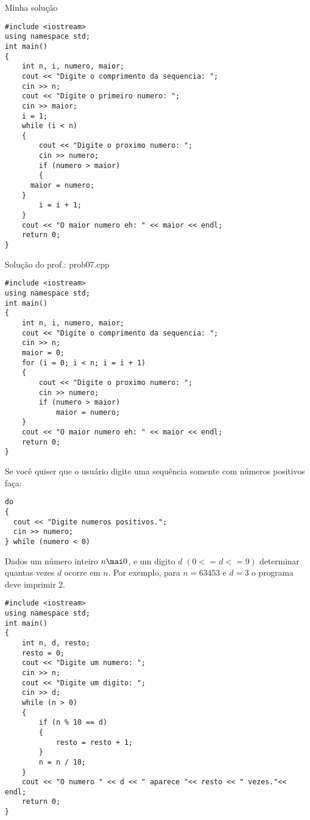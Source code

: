 \documentclass[a4paper]{memoir}
\begin{document}
\begin{sol}
Minha solução

\begin{lstlisting}
#include <iostream>
using namespace std;
int main()
{
    int n, i, numero, maior;
    cout << "Digite o comprimento da sequencia: ";
    cin >> n;
    cout << "Digite o primeiro numero: ";
    cin >> maior;
    i = 1;
    while (i < n)
    {
        cout << "Digite o proximo numero: ";
        cin >> numero;
        if (numero > maior)
        {
	  maior = numero;
	}
        i = i + 1;
    }
    cout << "O maior numero eh: " << maior << endl;
    return 0;
}
\end{lstlisting}

Solução do prof.: prob07.cpp
\begin{lstlisting}
#include <iostream>
using namespace std;
int main()
{
    int n, i, numero, maior;
    cout << "Digite o comprimento da sequencia: ";
    cin >> n;
    maior = 0;
    for (i = 0; i < n; i = i + 1)
    {
        cout << "Digite o proximo numero: ";
        cin >> numero;
        if (numero > maior)
            maior = numero;
    }
    cout << "O maior numero eh: " << maior << endl;
    return 0;
}
\end{lstlisting}
\end{sol}

Se você quiser que o usuário digite uma sequência somente com números positivos faça:

\begin{lstlisting}
do
{
  cout << "Digite numeros positivos.";
  cin >> numero;
} while (numero < 0)
\end{lstlisting}

\begin{ex}[extra]\label{prob1extra01.cpp}
Dados um número inteiro $n \mai 0$, e um digito $d$ $(0 <= d <= 9)$ determinar quantas vezes $d$ ocorre em $n$. Por exemplo, para $n = 63453$ e $d = 3$ o programa deve imprimir $2$.
\end{ex}

\begin{sol}
\begin{lstlisting}
#include <iostream>
using namespace std;
int main()
{
    int n, d, resto;
    resto = 0;
    cout << "Digite um numero: ";
    cin >> n;
    cout << "Digite um digito: ";
    cin >> d;
    while (n > 0)
    {
        if (n % 10 == d)
        {
            resto = resto + 1;
        }
        n = n / 10;
    }
    cout << "O numero " << d << " aparece "<< resto << " vezes."<< endl;
    return 0;
}
\end{lstlisting}
\end{sol}
\end{document}
